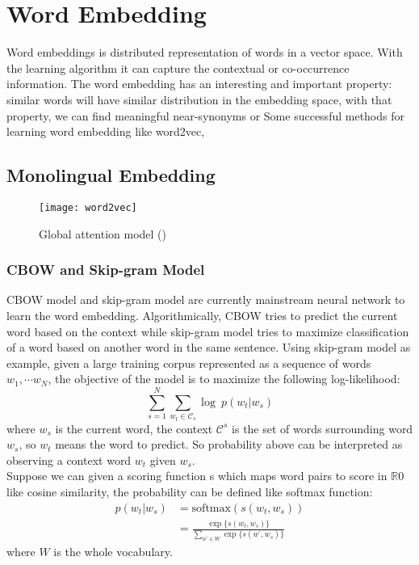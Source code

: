 \chapter{Word Embedding}
Word embeddings is distributed representation of words in a vector space. With the learning algorithm it can capture the contextual or co-occurrence information. The word embedding has an interesting and important property: similar words will have similar distribution in the embedding space, with that property, we can find meaningful near-synonyms or  Some successful methods for learning word embedding like word2vec\cite{mikolov2013distributed}, \cite{pennington2014glove}

\section{Monolingual Embedding}
\begin{figure}[h]
	\texttt{[image: word2vec]}
	\caption{Global attention model (\cite{mikolov2013efficient})}
	\centering
\end{figure}
\subsection{CBOW and Skip-gram Model}
CBOW model and skip-gram model are currently mainstream neural network to learn the word embedding. Algorithmically,  CBOW tries to predict the current word based on the context while skip-gram model tries to maximize classification of a word based on another word in the same sentence. Using skip-gram model as example, given a large training corpus represented as a sequence of words ${w_1, \cdots w_N}$, the objective of the model is to maximize the following log-likelihood:
\[ \sum_{s=1}^{N} \sum_{w_t \in \mathcal{C}_s} \log\ {p(w_t|w_s)} \]
where $w_s$ is the current word, the context $\mathcal{C}^s$ is the set of words surrounding word $w_s$, so $w_t$ means the word to predict. So probability above can be interpreted as observing a context word $w_t$ given $w_s$.\\

Suppose we can given a scoring function s which maps word pairs to score in $\mathbb{R}0$ like cosine similarity, the probability can be defined like softmax function:
\begin{align}
p(w_t | w_s) & = \textrm{softmax} {(s(w_t, w_s))} \\
& = \frac{\exp\{s(w_t, w_s)\}}{\sum_{w^{\prime} \in W}{\exp\{s( w^{\prime}, w_s)\}}} 
\end{align}
where $W$ is the whole vocabulary. \\

